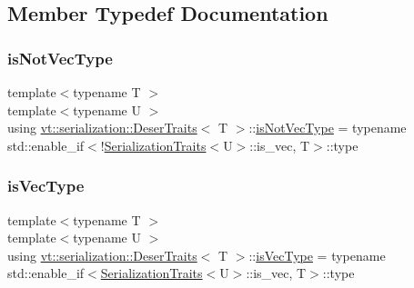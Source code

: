 \subsection{Member Typedef Documentation}
\mbox{\label{structvt_1_1serialization_1_1_deser_traits_a76eb20c400792b9288eabf2a7ffca4ba}} 
\subsubsection{\texorpdfstring{is\+Not\+Vec\+Type}{isNotVecType}}
{\footnotesize\ttfamily template$<$typename T $>$ \\
template$<$typename U $>$ \\
using \hyperlink{structvt_1_1serialization_1_1_deser_traits}{vt\+::serialization\+::\+Deser\+Traits}$<$ T $>$\+::\hyperlink{structvt_1_1serialization_1_1_deser_traits_a76eb20c400792b9288eabf2a7ffca4ba}{is\+Not\+Vec\+Type} =  typename std\+::enable\+\_\+if$<$!\hyperlink{structvt_1_1serialization_1_1_serialization_traits}{Serialization\+Traits}$<$U$>$\+::is\+\_\+vec, T$>$\+::type}

\mbox{\label{structvt_1_1serialization_1_1_deser_traits_a597577985e3b199e73cf052e445c9a5e}} 
\subsubsection{\texorpdfstring{is\+Vec\+Type}{isVecType}}
{\footnotesize\ttfamily template$<$typename T $>$ \\
template$<$typename U $>$ \\
using \hyperlink{structvt_1_1serialization_1_1_deser_traits}{vt\+::serialization\+::\+Deser\+Traits}$<$ T $>$\+::\hyperlink{structvt_1_1serialization_1_1_deser_traits_a597577985e3b199e73cf052e445c9a5e}{is\+Vec\+Type} =  typename std\+::enable\+\_\+if$<$\hyperlink{structvt_1_1serialization_1_1_serialization_traits}{Serialization\+Traits}$<$U$>$\+::is\+\_\+vec, T$>$\+::type}




